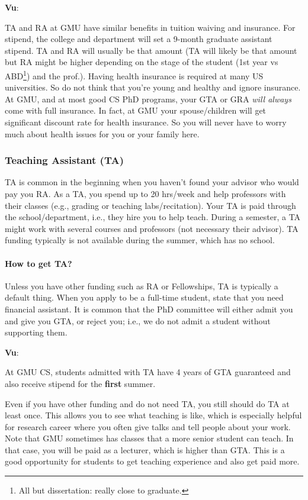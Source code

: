 \documentclass[11pt]{article}
\newenvironment{commentbox}[1][]{
\small
    \begin{cbox}
    \textbf{#1}: 
 }{
   \end{cbox}
}
\begin{document}
\begin{commentbox}[Vu]
TA and RA at GMU have similar benefits in tuition waiving and insurance.  For stipend, the college and department will set a 9-month graduate assistant stipend.  TA and RA will usually be that amount (TA will likely be that amount but RA might be higher depending on the stage of the student (1st year vs ABD\footnote{All but dissertation: really close to graduate.}) and the prof.). 
\tcblower
Having health insurance is required at many US universities.  So do not think that you're young and healthy and ignore insurance.  At GMU, and at most good CS PhD programs, your GTA or GRA \emph{will always} come with full insurance. In fact, at GMU your spouse/children will get significant discount rate for health insurance.  So you will never have to worry much about health issues for you or your family here.
\end{commentbox}


\subsubsection{Teaching Assistant (TA)}

TA is common in the beginning when you haven't found your advisor who would pay you RA. As a TA, you spend up to 20 hrs/week and help professors with their classes (e.g., grading or teaching labs/recitation). Your TA is paid through the school/department, i.e., they hire you to help teach.  During a semester, a TA might work with several courses and professors (not necessary their advisor).  TA funding typically is not available during the summer, which has no school.

\paragraph{How to get TA?}  Unless you have other funding such as RA or Fellowships, TA is typically a default thing. When you apply to be a full-time student,  state that you need financial assistant. It is common that the PhD committee will either admit you and give you GTA, or reject you; i.e., we do not admit a student without supporting them.  

\begin{commentbox}[Vu]
At GMU CS, students admitted with TA have  4 years of GTA guaranteed and also receive  stipend for the \textbf{first} summer.
\end{commentbox}

Even if you have other funding and do not need TA, you still should do TA at least once.  This allows you to see what teaching is like, which is especially helpful for research career where you often give talks and tell people about your work. Note that GMU sometimes has classes that a more senior student can teach.  In that case, you will be paid as a lecturer, which is higher than GTA.  This is a good opportunity for students to get teaching experience and also get paid more.
\end{document}

